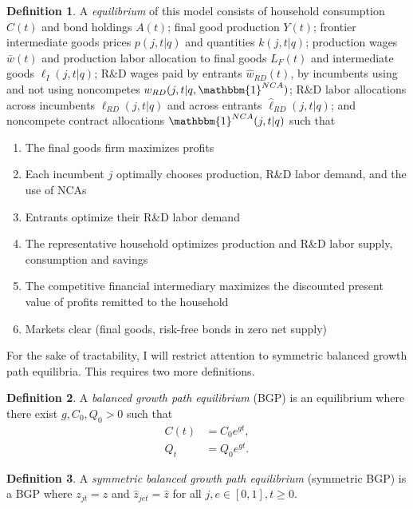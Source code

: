 \documentclass[11pt,english]{article}
\theoremstyle{definition}
\newtheorem{definition}{Definition}
\begin{document}
\theoremstyle{definition}
\begin{definition}
	A \emph{equilibrium} of this model consists of household consumption $C(t)$ and bond holdings $A(t)$; final good production $Y(t)$; frontier intermediate goods prices $p(j,t|q)$ and quantities $k(j,t|q)$; production wages $\bar{w}(t)$ and production labor allocation to final goods $L_{F}(t)$ and intermediate goods $\ell_I(j,t|q)$; R\&D wages paid by entrants $\hat{w}_{RD}(t)$, by incumbents using and not using noncompetes $w_{RD}(j,t|q,\mathbbm{1}^{NCA})$; R\&D labor allocations across incumbents $\ell_{RD}(j,t|q)$ and across entrants $\hat{\ell}_{RD}(j,t|q)$; and noncompete contract allocations $\mathbbm{1}^{NCA}(j,t|q)$ such that 
	\begin{enumerate}
		\item The final goods firm maximizes profits
		\item Each incumbent $j$ optimally chooses production, R\&D labor demand, and the use of NCAs
		\item Entrants optimize their R\&D labor demand
		\item The representative household optimizes production and R\&D labor supply, consumption and savings
		\item The competitive financial intermediary maximizes the discounted present value of profits remitted to the household
		\item Markets clear (final goods, risk-free bonds in zero net supply)
	\end{enumerate}
\end{definition}

For the sake of tractability, I will restrict attention to symmetric balanced growth path equilibria. This requires two more definitions.

\theoremstyle{definition}
\begin{definition}
	A \emph{balanced growth path equilibrium} (BGP) is an equilibrium where there exist $g, C_0, Q_0 > 0$ such that
	\begin{align*}
		C(t) &= C_0 e^{gt}, \\
		Q_t &= Q_0 e^{gt}.
	\end{align*}
\end{definition}

\theoremstyle{definition}
\begin{definition}
	A \emph{symmetric balanced growth path equilibrium} (symmetric BGP) is a BGP where $z_{jt} = z$ and $\hat{z}_{jet} = \hat{z}$ for all $j,e \in [0,1], t \ge 0$. 
\end{definition}
\end{document}
